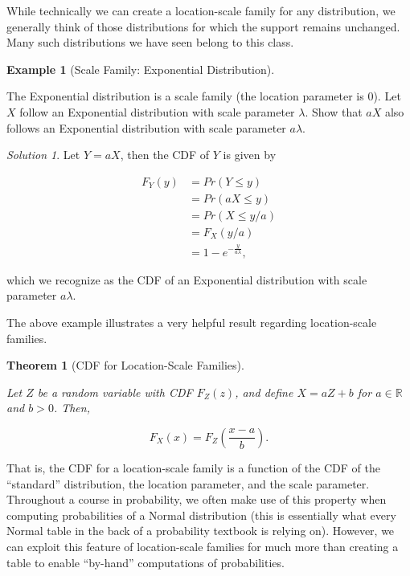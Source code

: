 \documentclass[
  letterpaper,
  DIV=11,
  numbers=noendperiod]{scrreprt}
\theoremstyle{definition}
\theoremstyle{definition}
\newtheorem{example}{Example}[chapter]
\theoremstyle{plain}
\newtheorem{theorem}{Theorem}[chapter]
\theoremstyle{remark}
\newtheorem*{solution}{Solution}
\begin{document}
While technically we can create a location-scale family for any
distribution, we generally think of those distributions for which the
support remains unchanged. Many such distributions we have seen belong
to this class.

\begin{example}[Scale Family: Exponential
Distribution]\protect\hypertarget{exm-exponential-scale}{}\label{exm-exponential-scale}

The Exponential distribution is a scale family (the location parameter
is 0). Let \(X\) follow an Exponential distribution with scale parameter
\(\lambda\). Show that \(aX\) also follows an Exponential distribution
with scale parameter \(a\lambda\).

\end{example}

\begin{solution}

Let \(Y = aX\), then the CDF of \(Y\) is given by

\[
\begin{aligned}
  F_Y(y)
    &= Pr(Y \leq y) \\
    &= Pr(aX \leq y) \\
    &= Pr(X \leq y/a) \\
    &= F_X(y/a) \\
    &= 1 - e^{-\frac{y}{a\lambda}},
\end{aligned}
\]

which we recognize as the CDF of an Exponential distribution with scale
parameter \(a\lambda\).

\end{solution}

The above example illustrates a very helpful result regarding
location-scale families.

\begin{theorem}[CDF for Location-Scale
Families]\protect\hypertarget{thm-location-scale}{}\label{thm-location-scale}

Let \(Z\) be a random variable with CDF \(F_Z(z)\), and define
\(X = aZ + b\) for \(a \in \mathbb{R}\) and \(b > 0\). Then,

\[F_X(x) = F_Z\left(\frac{x - a}{b}\right).\]

\end{theorem}

That is, the CDF for a location-scale family is a function of the CDF of
the ``standard'' distribution, the location parameter, and the scale
parameter. Throughout a course in probability, we often make use of this
property when computing probabilities of a Normal distribution (this is
essentially what every Normal table in the back of a probability
textbook is relying on). However, we can exploit this feature of
location-scale families for much more than creating a table to enable
``by-hand'' computations of probabilities.
\end{document}

